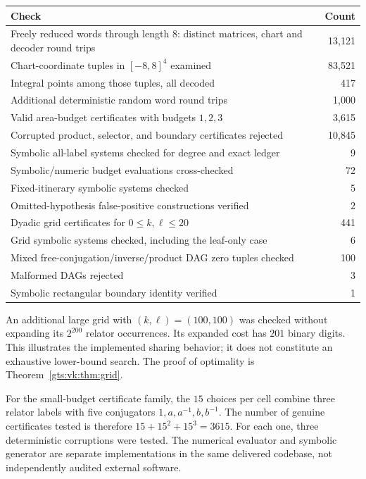 \documentclass[11pt,letterpaper]{article}
\theoremstyle{definition}
\theoremstyle{remark}
\begin{document}
\begin{center}
\begin{tabular}{L{0.72\textwidth}r}
\toprule
Check & Count\\
\midrule
Freely reduced words through length $8$: distinct matrices, chart and decoder round trips & 13,121\\
Chart-coordinate tuples in $[-8,8]^4$ examined & 83,521\\
Integral points among those tuples, all decoded & 417\\
Additional deterministic random word round trips & 1,000\\
Valid area-budget certificates with budgets $1,2,3$ & 3,615\\
Corrupted product, selector, and boundary certificates rejected & 10,845\\
Symbolic all-label systems checked for degree and exact ledger & 9\\
Symbolic/numeric budget evaluations cross-checked & 72\\
Fixed-itinerary symbolic systems checked & 5\\
Omitted-hypothesis false-positive constructions verified & 2\\
Dyadic grid certificates for $0\leq k,\ell\leq20$ & 441\\
Grid symbolic systems checked, including the leaf-only case & 6\\
Mixed free-conjugation/inverse/product DAG zero tuples checked & 100\\
Malformed DAGs rejected & 3\\
Symbolic rectangular boundary identity verified & 1\\
\bottomrule
\end{tabular}
\end{center}

An additional large grid with $(k,\ell)=(100,100)$ was checked without expanding its $2^{200}$ relator occurrences. Its expanded cost has $201$ binary digits. This illustrates the implemented sharing behavior; it does not constitute an exhaustive lower-bound search. The proof of optimality is Theorem~\ref{gts:vk:thm:grid}.

For the small-budget certificate family, the $15$ choices per cell combine three relator labels with five conjugators $1,a,a^{-1},b,b^{-1}$. The number of genuine certificates tested is therefore
$15+15^2+15^3=3615$. For each one, three deterministic corruptions were tested. The numerical evaluator and symbolic generator are separate implementations in the same delivered codebase, not independently audited external software.
\end{document}
